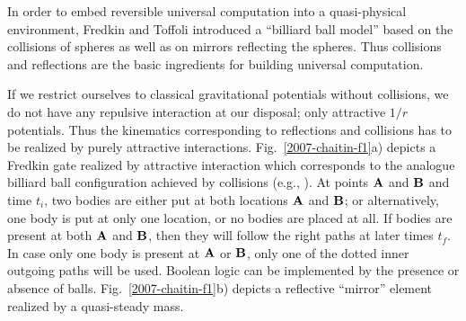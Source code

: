 \documentclass{ws-rv9x6}
\begin{document}
In order to embed reversible universal computation into a quasi-physical environment,
Fredkin and Toffoli introduced a ``billiard ball model''
\cite{fred-tof-82,margolus-billard,margolus-02,Adamatzky-02}
based on the collisions of spheres as well as on mirrors reflecting the spheres.
Thus collisions and reflections are the basic ingredients for building universal computation.

If we restrict ourselves to classical gravitational potentials without collisions,
we do not have any repulsive
interaction at our disposal; only attractive $1/r$ potentials.
Thus the kinematics corresponding to reflections and collisions has to be realized
by purely attractive interactions.
Fig.~\ref{2007-chaitin-f1}a) depicts a Fredkin gate realized by attractive interaction
which corresponds to the analogue billiard ball configuration achieved by collisions
(e.g., \cite[Fig.~4.5]{margolus-billard}).
At points
${\bf A}$
and
${\bf B}$
and time $t_i$,
two bodies are either put at both locations ${\bf A}$
and
${\bf B}$; or alternatively, one body is put
at only one location, or no bodies are placed at all.
If bodies are present at both  ${\bf A}$
and
${\bf B}$, then they will follow the right paths at later times $t_f$.
In case only one body is present at ${\bf A}$
or
${\bf B}$, only one of the dotted inner outgoing paths will be used.
Boolean logic can be implemented by the presence or absence of balls.
Fig.~\ref{2007-chaitin-f1}b) depicts a reflective ``mirror'' element realized by a quasi-steady mass.
\end{document}
